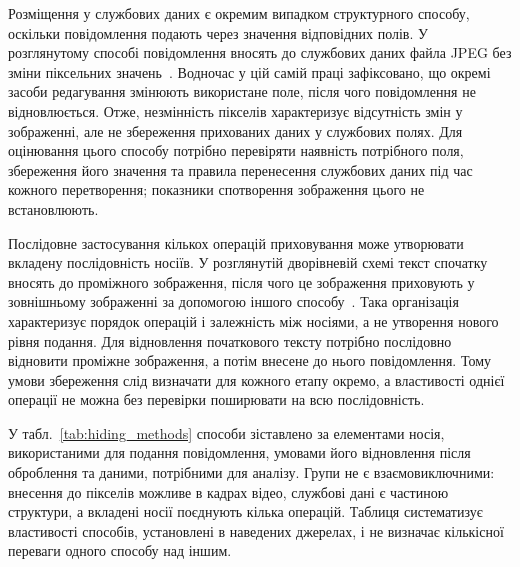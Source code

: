 Розміщення у службових даних є окремим випадком структурного способу, оскільки повідомлення подають через значення відповідних полів. У розглянутому способі повідомлення вносять до службових даних файла JPEG без зміни піксельних значень~\cite{fernando2024metadata}. Водночас у цій самій праці зафіксовано, що окремі засоби редагування змінюють використане поле, після чого повідомлення не відновлюється. Отже, незмінність пікселів характеризує відсутність змін у зображенні, але не збереження прихованих даних у службових полях. Для оцінювання цього способу потрібно перевіряти наявність потрібного поля, збереження його значення та правила перенесення службових даних під час кожного перетворення; показники спотворення зображення цього не встановлюють.

Послідовне застосування кількох операцій приховування може утворювати вкладену послідовність носіїв. У розглянутій дворівневій схемі текст спочатку вносять до проміжного зображення, після чого це зображення приховують у зовнішньому зображенні за допомогою іншого способу~\cite{abuali2024multilevel}. Така організація характеризує порядок операцій і залежність між носіями, а не утворення нового рівня подання. Для відновлення початкового тексту потрібно послідовно відновити проміжне зображення, а потім внесене до нього повідомлення. Тому умови збереження слід визначати для кожного етапу окремо, а властивості однієї операції не можна без перевірки поширювати на всю послідовність.

У табл.~\ref{tab:hiding_methods} способи зіставлено за елементами носія, використаними для подання повідомлення, умовами його відновлення після оброблення та даними, потрібними для аналізу. Групи не є взаємовиключними: внесення до пікселів можливе в кадрах відео, службові дані є частиною структури, а вкладені носії поєднують кілька операцій. Таблиця систематизує властивості способів, установлені в наведених джерелах, і не визначає кількісної переваги одного способу над іншим.

